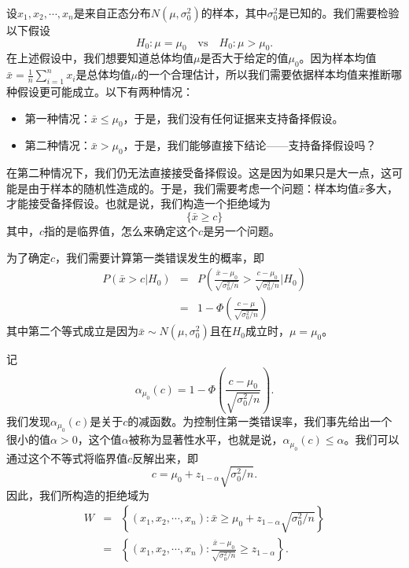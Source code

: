 \begin{example}\label{ex:chap22_one_sample_mean_z}
    设$x_1,x_2,\cdots,x_n$是来自正态分布$N(\mu,\sigma_0^2)$的样本，其中$\sigma_0^2$是已知的。我们需要检验以下假设
    $$
    H_0: \mu = \mu_0 \quad \text{vs} \quad H_0: \mu > \mu_0.    $$
    在上述假设中，我们想要知道总体均值$\mu$是否大于给定的值$\mu_0$。因为样本均值$\bar{x} = \frac{1}{n}\sum_{i=1}^n x_i$是总体均值$\mu$的一个合理估计，所以我们需要依据样本均值来推断哪种假设更可能成立。以下有两种情况：
    \begin{itemize}
        \item 第一种情况：$\bar{x} \leq \mu_0$，于是，我们没有任何证据来支持备择假设。
        \item 第二种情况：$\bar{x} > \mu_0$，于是，我们能够直接下结论——支持备择假设吗？
    \end{itemize}
    在第二种情况下，我们仍无法直接接受备择假设。这是因为如果只是大一点，这可能是由于样本的随机性造成的。于是，我们需要考虑一个问题：样本均值$\bar{x}$多大，才能接受备择假设。也就是说，我们构造一个拒绝域为
    $$
    \{\bar{x} \geq c\}
    $$
    其中，$c$指的是临界值，怎么来确定这个$c$是另一个问题。

    为了确定$c$，我们需要计算第一类错误发生的概率，即
    \begin{eqnarray*}
        P\left(\bar{x} > c |H_0\right) &= &P\left(\frac{\bar{x}-\mu_0}{\sqrt{\sigma_0^2/n}} > \frac{c-\mu_0}{\sqrt{\sigma_0^2/n}} |H_0\right) \\
        &=& 1-\Phi\left(\frac{c-\mu}{\sqrt{\sigma_0^2/n}}\right)
    \end{eqnarray*}
    其中第二个等式成立是因为$\bar{x}\sim N(\mu,\sigma_0^2)$且在$H_0$成立时，$\mu=\mu_0$。

    记
    $$
    \alpha_{\mu_0}(c) = 1-\Phi\left(\frac{c-\mu_0}{\sqrt{\sigma_0^2/n}}\right).
    $$
    我们发现$\alpha_{\mu_0}(c)$是关于$c$的减函数。为控制住第一类错误率，我们事先给出一个很小的值$\alpha>0$，这个值$\alpha$被称为显著性水平，也就是说，$\alpha_{\mu_0}(c)\leq \alpha$。我们可以通过这个不等式将临界值$c$反解出来，即
    $$
    c = \mu_0 + z_{1-\alpha} \sqrt{\sigma_0^2/n}.
    $$
    因此，我们所构造的拒绝域为
    \begin{eqnarray*}
         W &=& \left\{(x_1,x_2,\cdots,x_n): \bar{x} \geq  \mu_0 + z_{1-\alpha} \sqrt{\sigma_0^2/n}\right\} \\
         &=& \left\{(x_1,x_2,\cdots,x_n): \frac{\bar{x}-\mu_0}{\sqrt{\sigma_0^2/n}} \geq   z_{1-\alpha} \right\} .
    \end{eqnarray*}
    
\end{example}
